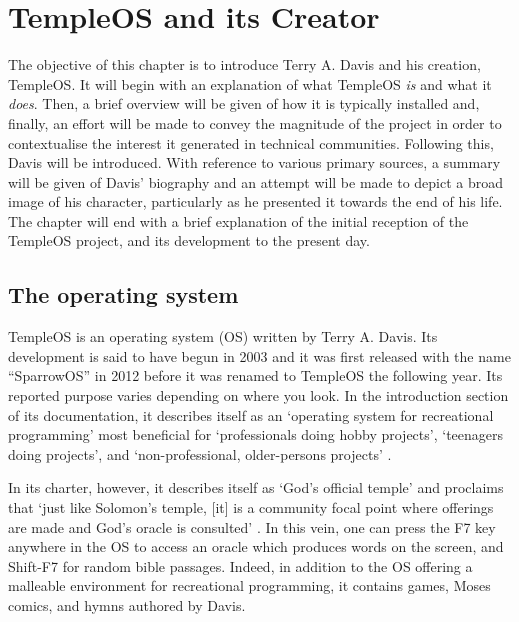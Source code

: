 \documentclass[Draft.tex]{subfiles}
\begin{document}
\chapter{TempleOS and its Creator}

The objective of this chapter is to introduce Terry A. Davis
and his creation, TempleOS.
It will begin with an explanation of what TempleOS \textit{is}
and what it \textit{does}.
Then, a brief overview will be given of how it is typically installed
and, finally, an effort will be made to convey
the magnitude of the project in order to contextualise
the interest it generated in technical communities.
Following this, Davis will be introduced.
With reference to various primary sources,
a summary will be given of Davis' biography and
an attempt will be made to depict a broad image of his character,
particularly as he presented it towards the end of his life.
The chapter will end with a brief explanation of the initial reception of
the TempleOS project, and its development to the present day.

\section*{The operating system}

TempleOS is an operating system (OS) written by Terry A. Davis.
Its development is said to have begun in 2003
and it was first released with the name ``SparrowOS'' in 2012
before it was renamed to TempleOS the following year.
Its reported purpose varies depending on where you look.
In the introduction section of its documentation, it describes itself as
an `operating system for recreational programming' most beneficial for
`professionals doing hobby projects', `teenagers doing projects',
and `non-professional, older-persons projects'
\parencite{Welcome}.

In its charter, however, it describes itself as `God's official temple'
and proclaims that
`just like Solomon’s temple, [it] is a community focal point
where offerings are made and God’s oracle is consulted'
\parencite{Charter}\footnotemark.
In this vein, one can press the F7 key anywhere in the OS
to access an oracle which produces words on the screen,
and Shift-F7 for random bible passages.
Indeed, in addition to the OS offering
a malleable environment for recreational programming,
it contains games, Moses comics, and hymns authored by Davis.

\end{document}
